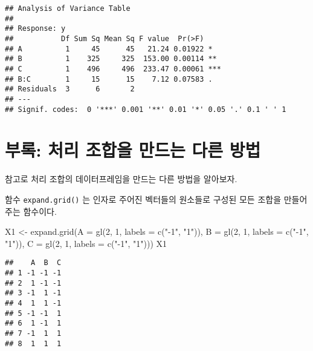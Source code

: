 \documentclass[
]{book}
\newenvironment{Shaded}{\begin{snugshade}}{\end{snugshade}}
\newcommand{\AttributeTok}[1]{\textcolor[rgb]{0.77,0.63,0.00}{#1}}
\newcommand{\DecValTok}[1]{\textcolor[rgb]{0.00,0.00,0.81}{#1}}
\newcommand{\FunctionTok}[1]{\textcolor[rgb]{0.00,0.00,0.00}{#1}}
\newcommand{\NormalTok}[1]{#1}
\newcommand{\OtherTok}[1]{\textcolor[rgb]{0.56,0.35,0.01}{#1}}
\newcommand{\StringTok}[1]{\textcolor[rgb]{0.31,0.60,0.02}{#1}}
\begin{document}
\begin{verbatim}
## Analysis of Variance Table
## 
## Response: y
##           Df Sum Sq Mean Sq F value  Pr(>F)    
## A          1     45      45   21.24 0.01922 *  
## B          1    325     325  153.00 0.00114 ** 
## C          1    496     496  233.47 0.00061 ***
## B:C        1     15      15    7.12 0.07583 .  
## Residuals  3      6       2                    
## ---
## Signif. codes:  0 '***' 0.001 '**' 0.01 '*' 0.05 '.' 0.1 ' ' 1
\end{verbatim}

\hypertarget{uxbd80uxb85d-uxcc98uxb9ac-uxc870uxd569uxc744-uxb9ccuxb4dcuxb294-uxb2e4uxb978-uxbc29uxbc95}{%
\section{부록: 처리 조합을 만드는 다른 방법}\label{uxbd80uxb85d-uxcc98uxb9ac-uxc870uxd569uxc744-uxb9ccuxb4dcuxb294-uxb2e4uxb978-uxbc29uxbc95}}

참고로 처리 조합의 데이터프레임을 만드는 다른 방법을 알아보자.

함수 \texttt{expand.grid()} 는 인자로 주어진 벡터들의 원소들로 구성된 모든 조합을 만들어 주는 함수이다.

\begin{Shaded}
\begin{Highlighting}[]
\NormalTok{X1 }\OtherTok{\textless{}{-}}  \FunctionTok{expand.grid}\NormalTok{(}\AttributeTok{A =} \FunctionTok{gl}\NormalTok{(}\DecValTok{2}\NormalTok{, }\DecValTok{1}\NormalTok{, }\AttributeTok{labels =} \FunctionTok{c}\NormalTok{(}\StringTok{"{-}1"}\NormalTok{, }\StringTok{"1"}\NormalTok{)),}
                   \AttributeTok{B =} \FunctionTok{gl}\NormalTok{(}\DecValTok{2}\NormalTok{, }\DecValTok{1}\NormalTok{, }\AttributeTok{labels =} \FunctionTok{c}\NormalTok{(}\StringTok{"{-}1"}\NormalTok{, }\StringTok{"1"}\NormalTok{)),}
                   \AttributeTok{C =} \FunctionTok{gl}\NormalTok{(}\DecValTok{2}\NormalTok{, }\DecValTok{1}\NormalTok{, }\AttributeTok{labels =} \FunctionTok{c}\NormalTok{(}\StringTok{"{-}1"}\NormalTok{, }\StringTok{"1"}\NormalTok{)))}
\NormalTok{X1}
\end{Highlighting}
\end{Shaded}

\begin{verbatim}
##    A  B  C
## 1 -1 -1 -1
## 2  1 -1 -1
## 3 -1  1 -1
## 4  1  1 -1
## 5 -1 -1  1
## 6  1 -1  1
## 7 -1  1  1
## 8  1  1  1
\end{verbatim}
\end{document}
